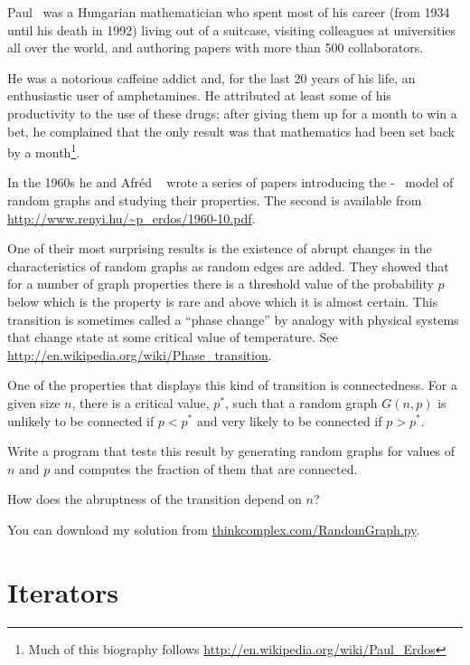\documentclass[10pt]{book}
\begin{document}
Paul \Erdos~was a Hungarian mathematician who spent most
of his career (from 1934 until his death in 1992) living out
of a suitcase, visiting colleagues at universities all over the
world, and authoring papers with more than 500 collaborators.

He was a notorious caffeine addict and, for the last 20 years of his
life, an enthusiastic user of amphetamines.  He attributed at least
some of his productivity to the use of these drugs; after giving them
up for a month to win a bet, he complained that the only result
was that mathematics had
been set back by a month\footnote{Much of this biography follows
\url{http://en.wikipedia.org/wiki/Paul_Erdos}}.

In the 1960s he and Afr\'{e}d \Renyi~ wrote a series of papers
introducing the \Erdos-\Renyi~
model of random graphs and studying their properties.
The second is available from \url{http://www.renyi.hu/~p_erdos/1960-10.pdf}.

One of their most surprising results is the existence of
abrupt changes in the characteristics of random graphs as
random edges are added.  They showed that for a number of
graph properties there is a threshold value of the probability
$p$ below which is the property is rare and above which it
is almost certain.  This transition is sometimes called
a ``phase change'' by analogy with physical systems that
change state at some critical value of temperature.
See \url{http://en.wikipedia.org/wiki/Phase_transition}.


\begin{exercise}

One of the properties that displays this kind of transition is
connectedness.  For a given size $n$, there is a critical value,
$p^*$, such that a random graph $G(n, p)$ is unlikely to be connected
if $p < p^*$ and very likely to be connected if $p > p^*$.

Write a program that tests this result by generating random graphs for
values of $n$ and $p$ and computes the fraction of them that
are connected.

How does the abruptness of the transition depend on $n$?

You can download my solution from
\url{thinkcomplex.com/RandomGraph.py}.

\end{exercise}


\section{Iterators}
\end{document}
